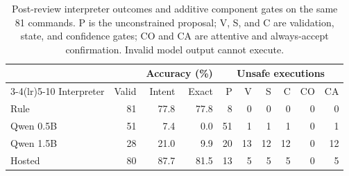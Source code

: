 \begin{table}[!t]
\caption{Post-review interpreter outcomes and additive component gates on the
same 81 commands. P is the unconstrained proposal; V, S, and C are validation,
state, and confidence gates; CO and CA are attentive and always-accept
confirmation. Invalid model output cannot execute.}
\label{tab:postreview}
\centering
\small
\setlength{\tabcolsep}{3pt}
\begin{tabular}{@{}lrrrrrrrrr@{}}
\toprule
 & & \multicolumn{2}{c}{Accuracy (\%)} & \multicolumn{6}{c}{Unsafe executions}\\
\cmidrule(lr){3-4}\cmidrule(lr){5-10}
Interpreter & Valid & Intent & Exact & P & V & S & C & CO & CA\\
\midrule
Rule & 81 & 77.8 & 77.8 & 8 & 0 & 0 & 0 & 0 & 0 \\
Qwen 0.5B & 51 & 7.4 & 0.0 & 51 & 1 & 1 & 1 & 0 & 1 \\
Qwen 1.5B & 28 & 21.0 & 9.9 & 20 & 13 & 12 & 12 & 0 & 12 \\
Hosted & 80 & 87.7 & 81.5 & 13 & 5 & 5 & 5 & 0 & 5 \\
\bottomrule
\end{tabular}
\end{table}
